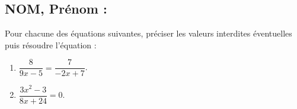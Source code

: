 \documentclass[a4paper,11pt,exos]{nsi}
\begin{document}
\subsection*{NOM, Prénom : \dotfill} 


\maketitle



\begin{exercice}
    Pour chacune des équations suivantes, préciser les valeurs interdites éventuelles puis résoudre l'équation :
    \begin{multicols}{3}
        \begin{enumerate}
            \item $\dfrac{8}{9x-5}=\dfrac{7}{-2x+7}$.
	        \item $\dfrac{3x^2-3}{8x+24}=0$.
        \end{enumerate}
    \end{multicols}
    
\end{exercice}

\end{document}
